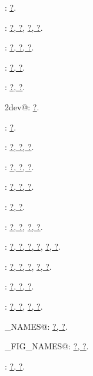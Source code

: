 \documentclass[twoside]{artikel3}
\renewcommand{\NWlink}[2]{\hyperlink{#1}{#2}}
\renewcommand{\NWlink}[2]{\hyperlink{#1}{#2}}
\begin{document}
{\small\begin{list}{}{\setlength{\itemsep}{-\parsep}\setlength{\itemindent}{-\leftmargin}}
\item \verb@all@: \underline{\NWlink{nuweb?}{?}}.
\item \verb@auxfil@: \underline{\NWlink{nuweb?}{?}}\NWlink{nuweb?}{, ?}, \underline{\NWlink{nuweb?}{?}}\NWlink{nuweb?}{, ?}.
\item \verb@bibtex@: \underline{\NWlink{nuweb?}{?}}\NWlink{nuweb?}{, ?}\NWlink{nuweb?}{, ?}.
\item \verb@boardnum@: \underline{\NWlink{nuweb?}{?}}\NWlink{nuweb?}{, ?}.
\item \verb@DIRS@: \underline{\NWlink{nuweb?}{?}}\NWlink{nuweb?}{, ?}.
\item \verb@fig2dev@: \underline{\NWlink{nuweb?}{?}}.
\item \verb@FIGFILENAMES@: \underline{\NWlink{nuweb?}{?}}.
\item \verb@FIGFILES@: \underline{\NWlink{nuweb?}{?}}\NWlink{nuweb?}{, ?}\NWlink{nuweb?}{, ?}.
\item \verb@indexfil@: \underline{\NWlink{nuweb?}{?}}\NWlink{nuweb?}{, ?}\NWlink{nuweb?}{, ?}.
\item \verb@makeindex@: \underline{\NWlink{nuweb?}{?}}\NWlink{nuweb?}{, ?}\NWlink{nuweb?}{, ?}.
\item \verb@MKDIR@: \underline{\NWlink{nuweb?}{?}}\NWlink{nuweb?}{, ?}.
\item \verb@nufil@: \underline{\NWlink{nuweb?}{?}}\NWlink{nuweb?}{, ?}, \underline{\NWlink{nuweb?}{?}}\NWlink{nuweb?}{, ?}.
\item \verb@nuweb@: \NWlink{nuweb?}{?}\NWlink{nuweb?}{, ?}\NWlink{nuweb?}{, ?}\NWlink{nuweb?}{, ?}, \underline{\NWlink{nuweb?}{?}}\NWlink{nuweb?}{, ?}.
\item \verb@oldaux@: \underline{\NWlink{nuweb?}{?}}\NWlink{nuweb?}{, ?}\NWlink{nuweb?}{, ?}, \underline{\NWlink{nuweb?}{?}}\NWlink{nuweb?}{, ?}.
\item \verb@oldindexfil@: \underline{\NWlink{nuweb?}{?}}\NWlink{nuweb?}{, ?}\NWlink{nuweb?}{, ?}.
\item \verb@pdf@: \NWlink{nuweb?}{?}\NWlink{nuweb?}{, ?}, \underline{\NWlink{nuweb?}{?}}\NWlink{nuweb?}{, ?}.
\item \verb@PDFT_NAMES@: \underline{\NWlink{nuweb?}{?}}\NWlink{nuweb?}{, ?}.
\item \verb@PDF_FIG_NAMES@: \underline{\NWlink{nuweb?}{?}}\NWlink{nuweb?}{, ?}.
\item \verb@PHONY@: \underline{\NWlink{nuweb?}{?}}\NWlink{nuweb?}{, ?}.

\end{list}}
\end{document}
